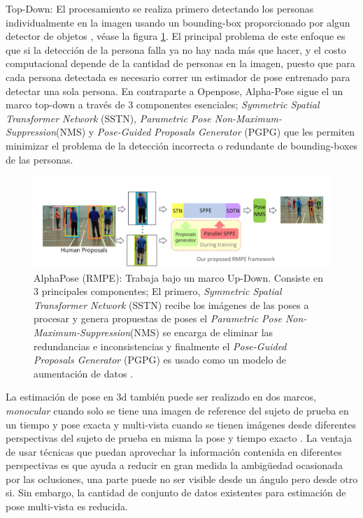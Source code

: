 Top-Down: El procesamiento se realiza primero detectando los personas individualmente en la imagen
usando un bounding-box proporcionado por algun detector de objetos
\cite{DBLP:journals/corr/NewellYD16} \cite{DBLP:journals/corr/WeiRKS16},
véase la figura \ref{fig:alphapose}.
El principal problema de este enfoque es que si la detección de la persona falla ya no hay nada más
que hacer, y el costo computacional depende de la cantidad de personas en la imagen, puesto que para
cada persona detectada es necesario correr un estimador de pose entrenado para detectar una sola
persona. En contraparte a Openpose, Alpha-Pose \cite{DBLP:journals/corr/FangXL16} sigue el un marco
top-down a través de 3 componentes esenciales; \textit{Symmetric Spatial Transformer Network} (SSTN),
\textit{Parametric Pose Non-Maximum-Suppression}(NMS) y \textit{Pose-Guided Proposals Generator}
(PGPG) que les permiten minimizar el problema de la detección incorrecta o redundante de
bounding-boxes de las personas.

\begin{figure}[ht!]
    \centering
    \includegraphics[width=0.8 \textwidth]{Chapters/1. HPE_LUNG/figures/alpha-pose.png}
    \caption{AlphaPose (RMPE): Trabaja bajo un marco Up-Down. Consiste en 3 principales componentes;
            El primero, \textit{Symmetric Spatial Transformer Network} (SSTN) recibe los imágenes de
            las poses a procesar y genera propuestas de poses el
            \textit{Parametric Pose Non-Maximum-Suppression}(NMS) se encarga de eliminar las
            redundancias e inconsistencias y finalmente el \textit{Pose-Guided Proposals Generator}
            (PGPG) es usado como un modelo de aumentación de datos
            \cite{DBLP:journals/corr/FangXL16}.}
    \label{fig:alphapose}
\end{figure}

La estimación de pose en 3d también puede ser realizado en dos marcos, \textit{monocular}
cuando solo se tiene una imagen de reference del sujeto de prueba en un tiempo y pose exacta
\cite{DBLP:journals/corr/MartinezHRL17} \cite{8954163} \cite{DBLP:journals/corr/abs-2002-10322}
\cite{DBLP:journals/corr/abs-1711-08585} \cite{DBLP:journals/corr/abs-2004-11822}
y multi-vista cuando se tienen imágenes desde diferentes perspectivas del sujeto de prueba en misma
la pose y tiempo exacto \cite{DBLP:journals/corr/abs-1905-05754} \cite{DBLP:journals/corr/abs-1901-04111}
\cite{DBLP:journals/corr/abs-2004-06239}.
La ventaja de usar técnicas que puedan aprovechar la información contenida
en diferentes perspectivas es que ayuda a reducir en gran medida la ambigüedad ocasionada por las
oclusiones, una parte puede no ser visible desde un ángulo pero desde otro si. Sin embargo, la
cantidad de conjunto de datos existentes para estimación de pose multi-vista es reducida.



